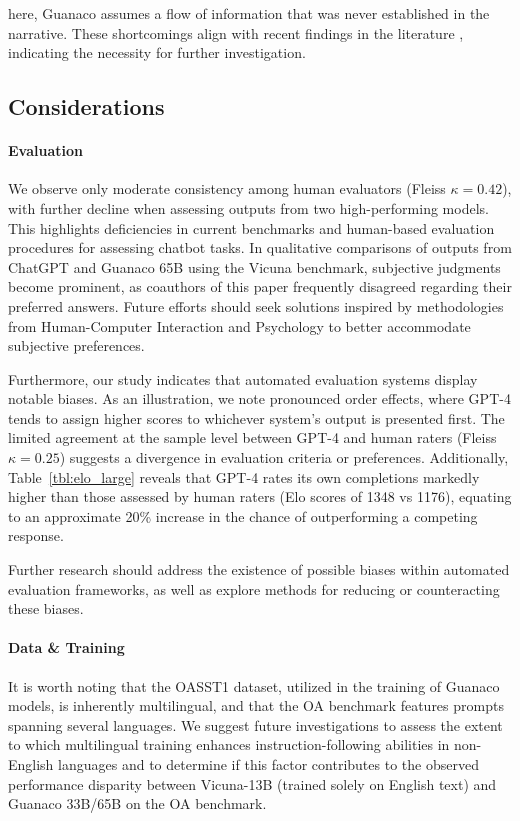 here, {Guanaco} assumes a flow of information that was never established in the narrative. These shortcomings align with recent findings in the literature \cite{sap2022neural}, indicating the necessity for further investigation.

\subsection{Considerations}
\label{ssec:considerations}

\paragraph{Evaluation}

We observe only moderate consistency among human evaluators (Fleiss $\kappa=0.42$), with further decline when assessing outputs from two high-performing models. This highlights deficiencies in current benchmarks and human-based evaluation procedures for assessing chatbot tasks. In qualitative comparisons of outputs from ChatGPT and {Guanaco} 65B using the Vicuna benchmark, subjective judgments become prominent, as coauthors of this paper frequently disagreed regarding their preferred answers. Future efforts should seek solutions inspired by methodologies from Human-Computer Interaction and Psychology to better accommodate subjective preferences.

Furthermore, our study indicates that automated evaluation systems display notable biases. As an illustration, we note pronounced order effects, where GPT-4 tends to assign higher scores to whichever system's output is presented first. The limited agreement at the sample level between GPT-4 and human raters (Fleiss $\kappa=0.25$) suggests a divergence in evaluation criteria or preferences. Additionally, Table~\ref{tbl:elo_large} reveals that GPT-4 rates its own completions markedly higher than those assessed by human raters (Elo scores of 1348 vs 1176), equating to an approximate 20\% increase in the chance of outperforming a competing response.

Further research should address the existence of possible biases within automated evaluation frameworks, as well as explore methods for reducing or counteracting these biases.

\paragraph{Data \& Training} It is worth noting that the OASST1 dataset, utilized in the training of {Guanaco} models, is inherently multilingual, and that the OA benchmark features prompts spanning several languages. We suggest future investigations to assess the extent to which multilingual training enhances instruction-following abilities in non-English languages and to determine if this factor contributes to the observed performance disparity between Vicuna-13B (trained solely on English text) and {Guanaco} 33B/65B on the OA benchmark.

